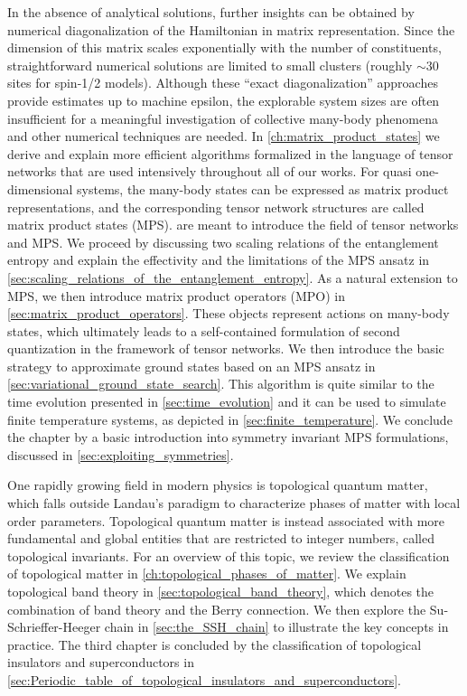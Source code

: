 In the absence of analytical solutions, further insights can be obtained by numerical diagonalization of the Hamiltonian in matrix representation.
Since the dimension of this matrix scales exponentially with the number of constituents, straightforward numerical solutions are limited to small clusters (roughly $\sim 30$ sites for spin-1/2 models).
Although these ``exact diagonalization'' approaches provide estimates up to machine epsilon, the explorable system sizes are often insufficient for a meaningful investigation of collective many-body phenomena and other numerical techniques are needed.
In \cref{ch:matrix_product_states} we derive and explain more efficient algorithms formalized in the language of tensor networks that are used intensively throughout all of our works.
For quasi one-dimensional systems, the many-body states can be expressed as matrix product representations, and the corresponding tensor network structures are called matrix product states (MPS).
 are meant to introduce the field of tensor networks and MPS.
We proceed by discussing two scaling relations of the entanglement entropy and explain the effectivity and the limitations of the MPS ansatz in \cref{sec:scaling_relations_of_the_entanglement_entropy}.
As a natural extension to MPS, we then introduce matrix product operators (MPO) in \cref{sec:matrix_product_operators}.
These objects represent actions on many-body states, which ultimately leads to a self-contained formulation of second quantization in the framework of tensor networks.
We then introduce the basic strategy to approximate ground states based on an MPS ansatz in \cref{sec:variational_ground_state_search}.
This algorithm is quite similar to the time evolution presented in \cref{sec:time_evolution} and it can be used to simulate finite temperature systems, as depicted in \cref{sec:finite_temperature}.
We conclude the chapter by a basic introduction into symmetry invariant MPS formulations, discussed in \cref{sec:exploiting_symmetries}.

One rapidly growing field in modern physics is topological quantum matter, which falls outside Landau's paradigm to characterize phases of matter with local order parameters.
Topological quantum matter is instead associated with more fundamental and global entities that are restricted to integer numbers, called topological invariants.
For an overview of this topic, we review the classification of topological matter in \cref{ch:topological_phases_of_matter}.
We explain topological band theory in \cref{sec:topological_band_theory}, which denotes the combination of band theory and the Berry connection.
We then explore the Su-Schrieffer-Heeger chain in \cref{sec:the_SSH_chain} to illustrate the key concepts in practice.
The third chapter is concluded by the classification of topological insulators and superconductors in \cref{sec:Periodic_table_of_topological_insulators_and_superconductors}.

